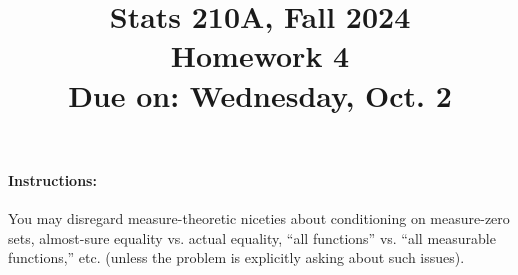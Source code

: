 \documentclass{article}
\theoremstyle{definition}
\begin{document}
\title{Stats 210A, Fall 2024\\
  Homework 4 \\
  {\large {\bf Due on}: Wednesday, Oct. 2}}
\date{}

\maketitle

\paragraph{Instructions:} You may disregard measure-theoretic niceties about conditioning on measure-zero sets, almost-sure equality vs. actual equality, ``all functions'' vs. ``all measurable functions,'' etc. (unless the problem is explicitly asking about such issues).
\end{document}
